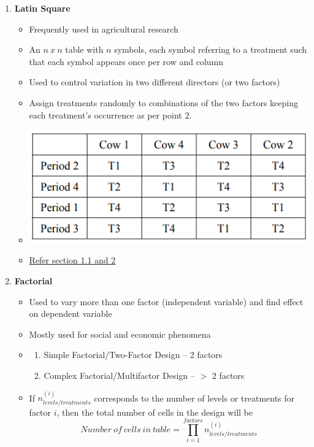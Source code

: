 \documentclass{article}
\begin{document}
\begin{enumerate}
    \item \textbf{Latin Square}
    \begin{itemize}
        \item Frequently used in agricultural research
        \item An $n\ x\ n$ table with $n$ symbols, each symbol referring to a treatment such that each symbol appears once per row and column
        \item Used to control variation in two different directors (or two factors)
        \item Assign treatments randomly to combinations of the two factors keeping each treatment's occurrence as per point 2.
        \item \includegraphics[width=0.7\linewidth]{img/LSD.png}
        \item \href{http://compneurosci.com/wiki/images/9/98/Latin_square_Method.pdf}{Refer section 1.1 and 2} 
    \end{itemize}
    
    \item \textbf{Factorial}
    \begin{itemize}
        \item Used to vary more than one factor  (independent variable) and find effect on dependent variable
        \item Mostly used for social and economic phenomena
        \item \begin{enumerate}
            \item Simple Factorial/Two-Factor Design -- 2 factors
            \item Complex Factorial/Multifactor Design -- $>$ 2 factors 
        \end{enumerate}
        \item If $n_{levels/treatments}^{(i)}$ corresponds to the number of levels or treatments for factor $i$, then the total number of cells in the design will be
        \begin{equation}
            {Number\ of\ cells\ in\ table} = \prod_{i=1}^{factors} n_{levels/treatments}^{(i)} 
        \end{equation}
    \end{itemize}
\end{enumerate}
\end{document}
